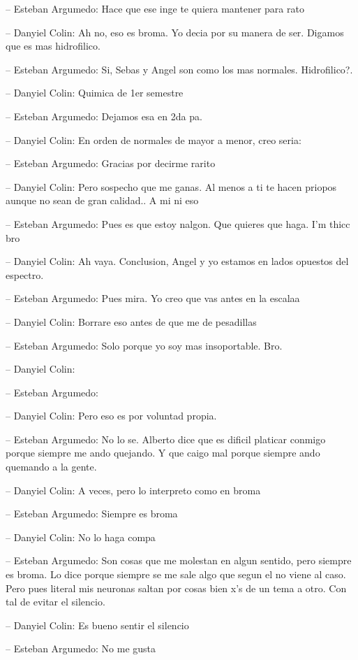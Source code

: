 -- Esteban Argumedo: Hace que ese inge te quiera mantener para rato

-- Danyiel Colin: Ah no, eso es broma. Yo decia por su manera de ser.
Digamos que es mas hidrofilico.

-- Esteban Argumedo: Si, Sebas y Angel son como los mas normales.
Hidrofilico?.

-- Danyiel Colin: Quimica de 1er semestre

-- Esteban Argumedo: Dejamos esa en 2da pa.

-- Danyiel Colin: En orden de normales de mayor a menor, creo seria:

-- Esteban Argumedo: Gracias por decirme rarito

-- Danyiel Colin: Pero sospecho que me ganas. Al menos a ti te hacen
priopos aunque no sean de gran calidad.. A mi ni eso

-- Esteban Argumedo: Pues es que estoy nalgon. Que quieres que haga. I'm
thicc bro

-- Danyiel Colin: Ah vaya. Conclusion, Angel y yo estamos en lados
opuestos del espectro.

-- Esteban Argumedo: Pues mira. Yo creo que vas antes en la escalaa

-- Danyiel Colin: Borrare eso antes de que me de pesadillas

-- Esteban Argumedo: Solo porque yo soy mas insoportable. Bro.

-- Danyiel Colin:

-- Esteban Argumedo:

-- Danyiel Colin: Pero eso es por voluntad propia.

-- Esteban Argumedo: No lo se. Alberto dice que es dificil platicar
conmigo porque siempre me ando quejando. Y que caigo mal porque siempre
ando quemando a la gente.

-- Danyiel Colin: A veces, pero lo interpreto como en broma

-- Esteban Argumedo: Siempre es broma

-- Danyiel Colin: No lo haga compa

-- Esteban Argumedo: Son cosas que me molestan en algun sentido, pero
siempre es broma. Lo dice porque siempre se me sale algo que segun el no
viene al caso. Pero pues literal mis neuronas saltan por cosas bien x's
de un tema a otro. Con tal de evitar el silencio.

-- Danyiel Colin: Es bueno sentir el silencio

-- Esteban Argumedo: No me gusta


